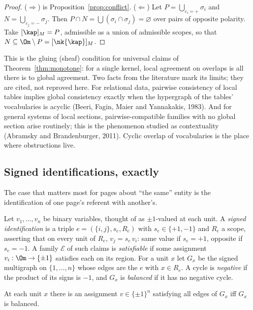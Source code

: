 \begin{proof}
($\Rightarrow$) is Proposition~\ref{prop:conflict}. ($\Leftarrow$) Let $P=\bigcup_{\varepsilon_i=+}\sigma_i$ and $N=\bigcup_{\varepsilon_j=-}\sigma_j$. Then $P\cap N=\bigcup(\sigma_i\cap\sigma_j)=\varnothing$ over pairs of opposite polarity. Take $[\kap]_M=P$, admissible as a union of admissible scopes, so that $N\subseteq\Om\setminus P=[\nk{\kap}]_M$.
\end{proof}

This is the gluing (sheaf) condition for universal claims of Theorem~\ref{thm:monotone}: for a single kernel, local agreement on overlaps is all there is to global agreement. Two facts from the literature mark its limits; they are cited, not reproved here. For relational data, pairwise consistency of local tables implies global consistency exactly when the hypergraph of the tables' vocabularies is acyclic (Beeri, Fagin, Maier and Yannakakis, 1983). And for general systems of local sections, pairwise-compatible families with no global section arise routinely; this is the phenomenon studied as contextuality (Abramsky and Brandenburger, 2011). Cyclic overlap of vocabularies is the place where obstructions live.

\subsection{Signed identifications, exactly}

The case that matters most for pages about ``the same'' entity is the identification of one page's referent with another's.

\begin{definition}
Let $v_1,\dots,v_n$ be binary variables, thought of as $\pm1$-valued at each unit. A \emph{signed identification} is a triple $e=(\{i,j\},s_e,R_e)$ with $s_e\in\{+1,-1\}$ and $R_e$ a scope, asserting that on every unit of $R_e$, $v_j=s_e\,v_i$: same value if $s_e=+1$, opposite if $s_e=-1$. A family $\mathcal E$ of such claims is \emph{satisfiable} if some assignment $v_i:\Om\to\{\pm1\}$ satisfies each on its region. For a unit $x$ let $G_x$ be the signed multigraph on $\{1,\dots,n\}$ whose edges are the $e$ with $x\in R_e$. A cycle is \emph{negative} if the product of its signs is $-1$, and $G_x$ is \emph{balanced} if it has no negative cycle.
\end{definition}

\begin{theorem}\label{thm:signed}
At each unit $x$ there is an assignment $v\in\{\pm1\}^n$ satisfying all edges of $G_x$ iff $G_x$ is balanced.
\end{theorem}

